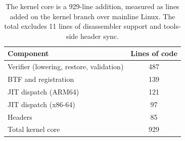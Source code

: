 \begin{table}[t]
\centering
\small
\caption{The kernel core is a 929-line addition, measured as lines added on the \tool kernel branch over mainline Linux. The total excludes 11 lines of disassembler support and tools-side header sync.}
\label{tab:kernel-loc}
\begin{tabular}{@{}lc@{}}
\toprule
Component & Lines of code \\
\midrule
Verifier (lowering, restore, validation) & 487 \\
BTF and registration & 139 \\
JIT dispatch (ARM64) & 121 \\
JIT dispatch (x86-64) & 97 \\
Headers & 85 \\
\midrule
Total kernel core & 929 \\
\bottomrule
\end{tabular}
\end{table}